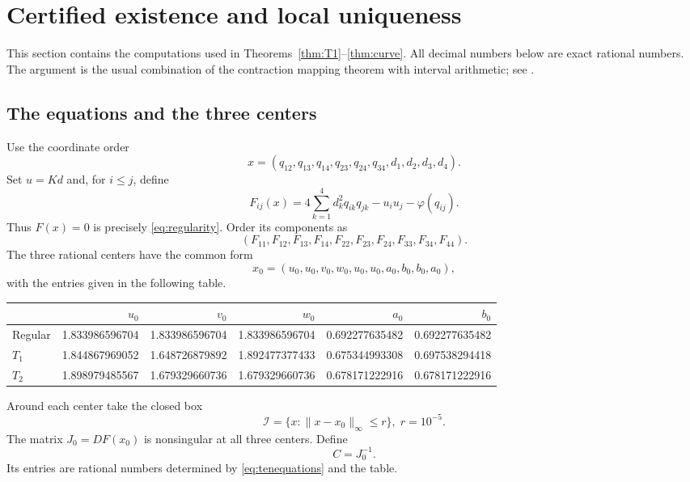 \documentclass[11pt]{article}
\theoremstyle{definition}
\theoremstyle{remark}
\newcommand{\norm}[1]{\lVert #1 \rVert}
\newcommand{\ph}{\varphi}
\begin{document}
\section{Certified existence and local uniqueness}
\label{sec:intervals}

This section contains the computations used in Theorems~\ref{thm:T1}--\ref{thm:curve}. All decimal numbers below are exact rational numbers. The argument is the usual combination of the contraction mapping theorem with interval arithmetic; see \cite{Krawczyk,Neumaier,Rump}.

\subsection{The equations and the three centers}

Use the coordinate order
\[
x=(q_{12},q_{13},q_{14},q_{23},q_{24},q_{34},d_1,d_2,d_3,d_4).
\]
Set $u=Kd$ and, for $i\le j$, define
\begin{equation}
F_{ij}(x)=4\sum_{k=1}^4d_k^2q_{ik}q_{jk}-u_i u_j-\ph(q_{ij}).
\label{eq:tenequations}
\end{equation}
Thus $F(x)=0$ is precisely \eqref{eq:regularity}. Order its components as
\[
(F_{11},F_{12},F_{13},F_{14},F_{22},F_{23},F_{24},F_{33},F_{34},F_{44}).
\]
The three rational centers have the common form
\begin{equation}
x_0=(u_0,u_0,v_0,w_0,u_0,u_0,a_0,b_0,b_0,a_0),
\label{eq:centerform}
\end{equation}
with the entries given in the following table.

\begin{center}
\small
\begin{tabular}{lrrrrr}
\toprule
 & $u_0$ & $v_0$ & $w_0$ & $a_0$ & $b_0$\\
\midrule
Regular & 1.833986596704 & 1.833986596704 & 1.833986596704 & 0.692277635482 & 0.692277635482\\
$T_1$ & 1.844867969052 & 1.648726879892 & 1.892477377433 & 0.675344993308 & 0.697538294418\\
$T_2$ & 1.898979485567 & 1.679329660736 & 1.679329660736 & 0.678171222916 & 0.678171222916\\
\bottomrule
\end{tabular}
\end{center}

Around each center take the closed box
\[
\mathcal I=\{x:\norm{x-x_0}_\infty\le r\},
\; r=10^{-5}.
\]
The matrix $J_0=DF(x_0)$ is nonsingular at all three centers. Define
\[
C=J_0^{-1}.
\]
Its entries are rational numbers determined by \eqref{eq:tenequations} and the table.
\end{document}
